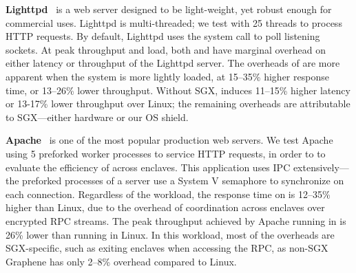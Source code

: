 {\bf Lighttpd}~\cite{lighttpd} is a web server designed to be light-weight, yet robust enough for commercial uses. 
Lighttpd is multi-threaded; we test with 25 threads to process HTTP requests. 
By default, Lighttpd uses the  system call to poll listening sockets.
At peak throughput and load,  both \graphene{} and \graphenesgx{} have marginal overhead on either latency or throughput of the Lighttpd server.
The overheads of \graphene{} are more apparent when the system
is more lightly loaded, at 
15--35\% higher response time, or 13--26\% lower throughput. 
Without SGX, \graphene{} induces 
11--15\% higher latency or 13-17\% lower throughput over Linux;
the remaining overheads are attributable to SGX---either hardware or our OS shield.




{\bf Apache}~\cite{apache} is one of the most popular production web servers. We test Apache using 5 preforked worker processes to service HTTP requests,
in order to 
to evaluate the efficiency of \graphenesgx{} across enclaves.
This application uses IPC extensively---the preforked processes of a server use a System V semaphore to synchronize on each connection.
Regardless of the workload, the response time on \graphenesgx{} is 12--35\% higher than Linux, due to the overhead of coordination across enclaves over encrypted RPC streams.
The peak throughput achieved by Apache running in \graphenesgx{} is 26\% lower than running in Linux.
In this workload, most of the overheads are SGX-specific, such as exiting enclaves when accessing the RPC, as non-SGX Graphene
has only 2--8\% overhead compared to Linux.

